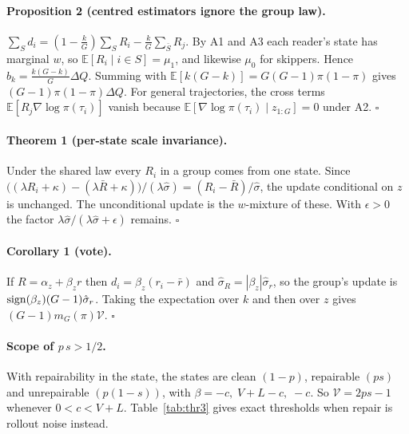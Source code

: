 \paragraph{Proposition 2 (centred estimators ignore the group law).}
$\sum_{S}d_i=(1-\tfrac kG)\sum_SR_i-\tfrac kG\sum_{\bar S}R_j$. By A1 and A3 each reader's state has marginal $w$, so
$\mathbb E[R_i\mid i\in S]=\mu_1$, and likewise $\mu_0$ for skippers. Hence $b_k=\tfrac{k(G-k)}G\Delta Q$. Summing
with $\mathbb E[k(G-k)]=G(G-1)\pi(1-\pi)$ gives $(G-1)\pi(1-\pi)\Delta Q$. For general trajectories, the cross terms
$\mathbb E[R_j\nabla\log\pi(\tau_i)]$ vanish because $\mathbb E[\nabla\log\pi(\tau_i)\mid z_{1:G}]=0$ under A2.
$\square$

\paragraph{Theorem 1 (per-state scale invariance).} Under the shared law every $R_i$ in a group comes from one state.
Since $\big((\lambda R_i+\kappa)-(\lambda\bar R+\kappa)\big)/(\lambda\hat\sigma)=(R_i-\bar R)/\hat\sigma$, the update
conditional on $z$ is unchanged. The unconditional update is the $w$-mixture of these. With $\epsilon>0$ the factor
$\lambda\hat\sigma/(\lambda\hat\sigma+\epsilon)$ remains. $\square$

\paragraph{Corollary 1 (vote).} If $R=\alpha_z+\beta_zr$ then $d_i=\beta_z(r_i-\bar r)$ and
$\hat\sigma_R=|\beta_z|\hat\sigma_r$, so the group's update is $\operatorname{sign}(\beta_z)(G-1)\hat\sigma_r$. Taking the
expectation over $k$ and then over $z$ gives $(G-1)m_G(\pi)\mathcal V$. $\square$

\paragraph{Scope of $p\,s>1/2$.} With repairability in the state, the states are clean $(1-p)$, repairable $(ps)$
and unrepairable $(p(1-s))$, with $\beta=-c,\;V+L-c,\;-c$. So $\mathcal V=2ps-1$ whenever $0<c<V+L$.
Table~\ref{tab:thr3} gives exact thresholds when repair is rollout noise instead.

\begin{table}[h]\centering\small
{}
\caption{Smallest fault rate at which the expected update at $\pi=0.3$, $G=8$ is positive
().}\label{tab:thr3}
\end{table}


